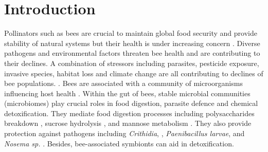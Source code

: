 \documentclass[11pt]{article}
\begin{document}
  \section{Introduction}
  Pollinators such as bees are crucial to maintain global food security and provide stability of natural systems \citep{hristov2020significance,bansch2021crop,khalifa2021overview} but their health is under increasing concern \citep{amiri2020using}. 
  Diverse pathogens and environmental factors threaten bee health and are contributing to their declines. 
  A combination of stressors including parasites, pesticide exposure, invasive species, habitat loss and climate change are all contributing to declines of bee populations. \citep{brown2009conservation,hristov2020factors,cheng2021ecology,zattara2021worldwide}.
  \newline
  Bees are associated with a community of microorganisms influencing host health \citep{engel2016bee,raymann2018role}. 
  Within the gut of bees, stable microbial communities (microbiomes) play crucial roles in food digestion, parasite defence and chemical detoxification. 
  They mediate food digestion processes including 
  polysaccharides breakdown \citep{zheng2019division}, sucrose hydrolysis \citep{engel2012functional,lee2015saccharide}, 
  and mannose metabolism \citep{engel2012functional,lee2015saccharide}. 
  They also provide protection against pathogens including \textit{Crithidia}, 
  \citep{koch2011socially,cariveau2014variation}, \textit{Paenibacillus larvae}, 
  \citep{ebeling2016biology,forsgren2010novel} and \textit{Nosema sp.} 
  \citep{cariveau2014variation,maes2016diet}. 
  Besides, bee-associated symbionts can aid in detoxification. 
\end{document}
